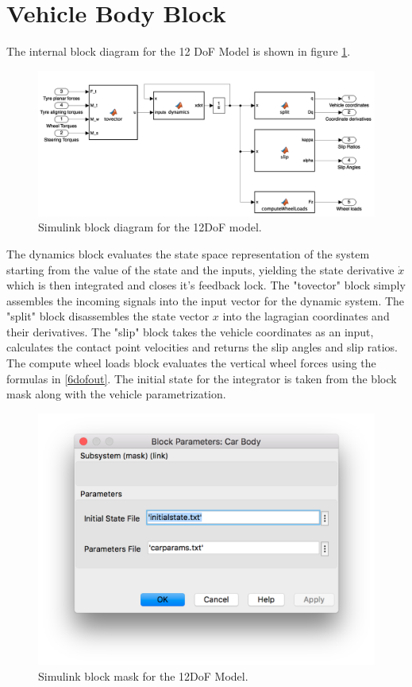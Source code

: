 \section{Vehicle Body Block}
\label{sec:bodyblock}
The internal block diagram for the 12 DoF Model is shown in figure \ref{12diag}.
\begin{figure}[ht]
  \centering
  \includegraphics[width=\textwidth]{images/12dofinside.png}
  \caption{Simulink block diagram for the 12DoF model.}
  \label{12diag}
\end{figure}
The dynamics block evaluates the state space representation of the system starting from the value of the state and the inputs, yielding the state derivative $\dot x$ which is then integrated and closes it's feedback lock.
The "tovector" block simply assembles the incoming signals into the input vector for the dynamic system. The "split" block disassembles the state vector $x$ into the lagragian coordinates and their derivatives.
The "slip" block takes the vehicle coordinates as an input, calculates the contact point velocities and returns the slip angles and slip ratios.
The compute wheel loads block evaluates the vertical wheel forces using the formulas in \ref{6dofout}.
The initial state for the integrator is taken from the block mask along with the vehicle parametrization.



\begin{figure}[ht]
  \centering
  \includegraphics[width=\textwidth]{images/bodymask.png}
  \caption{Simulink block mask for the 12DoF Model.}
\end{figure}




